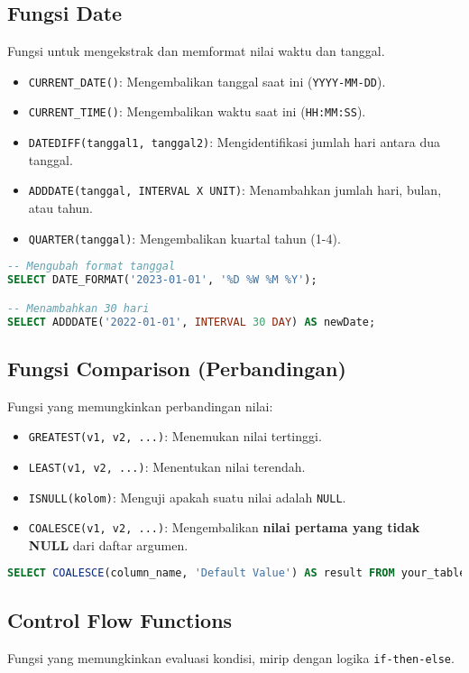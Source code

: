 \documentclass{article}
\begin{document}
\subsection{Fungsi Date}
Fungsi untuk mengekstrak dan memformat nilai waktu dan tanggal.
\begin{itemize}
    \item \texttt{CURRENT\_DATE()}: Mengembalikan tanggal saat ini (\texttt{YYYY-MM-DD}).
    \item \texttt{CURRENT\_TIME()}: Mengembalikan waktu saat ini (\texttt{HH:MM:SS}).
    \item \texttt{DATEDIFF(tanggal1, tanggal2)}: Mengidentifikasi jumlah hari antara dua tanggal.
    \item \texttt{ADDDATE(tanggal, INTERVAL X UNIT)}: Menambahkan jumlah hari, bulan, atau tahun.
    \item \texttt{QUARTER(tanggal)}: Mengembalikan kuartal tahun (1-4).
\end{itemize}
\begin{lstlisting}[language=SQL, caption={Contoh DATE\_FORMAT dan ADDDATE}, captionpos=b]
-- Mengubah format tanggal
SELECT DATE_FORMAT('2023-01-01', '%D %W %M %Y');

-- Menambahkan 30 hari
SELECT ADDDATE('2022-01-01', INTERVAL 30 DAY) AS newDate;
\end{lstlisting}

\subsection{Fungsi Comparison (Perbandingan)}
Fungsi yang memungkinkan perbandingan nilai:
\begin{itemize}
    \item \texttt{GREATEST(v1, v2, ...)}: Menemukan nilai tertinggi.
    \item \texttt{LEAST(v1, v2, ...)}: Menentukan nilai terendah.
    \item \texttt{ISNULL(kolom)}: Menguji apakah suatu nilai adalah \texttt{NULL}.
    \item \texttt{COALESCE(v1, v2, ...)}: Mengembalikan \textbf{nilai pertama yang tidak NULL} dari daftar argumen.
\end{itemize}
\begin{lstlisting}[language=SQL, caption={Contoh COALESCE}, captionpos=b]
SELECT COALESCE(column_name, 'Default Value') AS result FROM your_table;
\end{lstlisting}

\subsection{Control Flow Functions}
Fungsi yang memungkinkan evaluasi kondisi, mirip dengan logika \texttt{if-then-else}.
\end{document}
